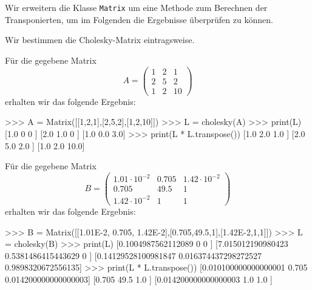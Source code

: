 \section{}

Wir erweitern die Klasse \texttt{Matrix} um eine Methode zum Berechnen der Transponierten, um im Folgenden die Ergebnisse überprüfen zu können.



Wir bestimmen die Cholesky-Matrix eintragsweise.



Für die gegebene Matrix
\[
    A
  = \begin{pmatrix}
      1 & 2 &  1 \\
      2 & 5 &  2 \\
      1 & 2 & 10
    \end{pmatrix}
\]
erhalten wir das folgende Ergebnis:

\begin{consoleoutput}
>>> A = Matrix([[1,2,1],[2,5,2],[1,2,10]])
>>> L = cholesky(A)
>>> print(L)
[1.0 0   0  ]
[2.0 1.0 0  ]
[1.0 0.0 3.0]
>>> print(L * L.transpose())
[1.0 2.0 1.0 ]
[2.0 5.0 2.0 ]
[1.0 2.0 10.0]
\end{consoleoutput}

Für die gegebene Matrix
\[
    B
  = \begin{pmatrix}
      1.01 \cdot 10^{-2}  & 0.705 &  1.42 \cdot 10^{-2} \\
      0.705               & 49.5  &  1 \\
      1.42 \cdot 10^{-2}  & 1     &  1
    \end{pmatrix}
\]
erhalten wir das folgende Ergebnis:

\begin{consoleoutput}
>>> B = Matrix([[1.01E-2, 0.705, 1.42E-2],[0.705,49.5,1],[1.42E-2,1,1]])
>>> L = cholesky(B)
>>> print(L)
[0.1004987562112089  0                    0                 ]
[7.015012190980423   0.5381486415443629   0                 ]
[0.14129528100981847 0.016374437298272527 0.9898320672556135]
>>> print(L * L.transpose())
[0.010100000000000001 0.705 0.014200000000000003]
[0.705                49.5  1.0                 ]
[0.014200000000000003 1.0   1.0                 ]
\end{consoleoutput}
